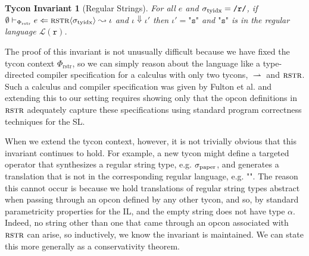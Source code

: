 \documentclass[10pt,preprint]{sigplanconf}
\newtheorem{tyconinvariant}{Tycon Invariant}
\newenvironment{proof-sketch}{\noindent{\emph{Proof Sketch.}}}{\qed}
\begin{document}
\begin{tyconinvariant}[Regular Strings]
For all $e$ and $\sigma_\text{tyidx}=\texttt{/r/}$, if $\emptyset \vdash_{\Phi_\text{rstr}} e \Leftarrow {\textsc{rstr}}\langle\sigma_\text{tyidx}\rangle \leadsto \iota$ and $\iota \Downarrow \iota'$ then $\iota'=\texttt{"s"}$ and $\texttt{"s"}$ is in the regular language $\mathcal{L}(\texttt{r})$.
\end{tyconinvariant}
\begin{proof-sketch} The proof of this invariant is not unusually difficult because we have fixed the tycon context $\Phi_\text{rstr}$, so we can simply reason about the language like a type-directed compiler specification for a calculus with only two tycons, $\rightharpoonup$ and $\textsc{rstr}$. Such a calculus and compiler specification was given by Fulton et al. \cite{sanitation-psp14} and extending this to our  setting requires showing only that the opcon definitions in $\textsc{rstr}$ adequately capture these specifications using standard program correctness techniques for the SL.\end{proof-sketch}

When we extend the tycon context, however, it is not trivially obvious that this invariant continues to hold. For example, a new tycon might define a targeted operator that synthesizes a regular string type, e.g. $\sigma_\text{paper}$, and generates a translation that is not in the corresponding regular language, e.g. $\texttt{""}$. The reason this cannot occur is because we hold translations of regular string types abstract  when passing through an opcon defined by any other tycon, and so, by standard parametricity properties for the IL, and the empty string does not have type $\alpha$. Indeed, no string other than one that came through an opcon associated with $\textsc{rstr}$ can arise, so inductively, we know the invariant is maintained. We can state this more generally as a conservativity theorem.
\end{document}
